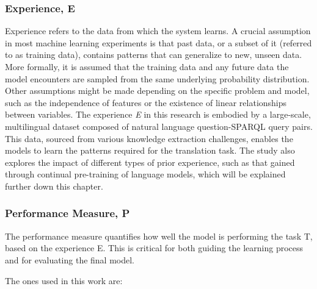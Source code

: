 \subsubsection{Experience, E}
Experience refers to the data from which the system learns. A crucial assumption in most machine learning experiments is that past data, or a subset of it (referred to as training data), contains patterns that can generalize to new, unseen data. 
More formally, it is assumed that the training data and any future data the model encounters are sampled from the same underlying probability distribution. Other assumptions might be made depending on the specific problem and model, such as the independence of features or the existence of linear relationships between variables.
The experience \textit{E} in this research is embodied by a large-scale, multilingual dataset composed of natural language question-SPARQL query pairs. This data, sourced from various knowledge extraction challenges, enables the models to learn the patterns required for the translation task. 
The study also explores the impact of different types of prior experience, such as that gained through continual pre-training of language models, which will be explained further down this chapter.

\subsubsection{Performance Measure, P}
The performance measure quantifies how well the model is performing the task T, based on the experience E. This is critical for both guiding the learning process and for evaluating the final model. 

The ones used in this work are:

